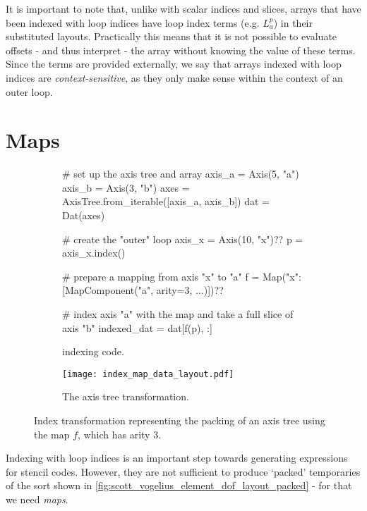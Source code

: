 \documentclass[thesis]{subfiles}
\begin{document}
It is important to note that, unlike with scalar indices and slices, arrays that have been indexed with loop indices have loop index terms (e.g. $L^p_a$) in their substituted layouts.
Practically this means that it is not possible to evaluate offsets - and thus interpret - the array without knowing the value of these terms.
Since the terms are provided externally, we say that arrays indexed with loop indices are \emph{context-sensitive}, as they only make sense within the context of an outer loop.

\section{Maps}

\begin{figure}
  \centering

  \begin{subfigure}{.9\textwidth}
    \begin{pyalg2}
      # set up the axis tree and array
      axis_a = Axis(5, "a")
      axis_b = Axis(3, "b")
      axes = AxisTree.from_iterable([axis_a, axis_b])
      dat = Dat(axes)

      # create the "outer" loop
      axis_x = Axis(10, "x")?\label{code:make_axis_x}?
      p = axis_x.index()

      # prepare a mapping from axis "x" to "a"
      f = Map({"x": [MapComponent("a", arity=3, ...)]})?\label{code:make_map}?

      # index axis "a" with the map and take a full slice of axis "b"
      indexed_dat = dat[f(p), :]
    \end{pyalg2}

    \caption{ indexing code.}
    \label{fig:index_map_code}
  \end{subfigure}

  \vspace{1em}

  \begin{subfigure}{\textwidth}
    \centering
    \texttt{[image: index\_map\_data\_layout.pdf]}
    \caption{The axis tree transformation.}
    \label{fig:index_map_data_layout}
  \end{subfigure}

  \caption{Index transformation representing the packing of an axis tree using the map $f$, which has arity 3.}
  \label{fig:index_map}
\end{figure}

Indexing with loop indices is an important step towards generating expressions for stencil codes.
However, they are not sufficient to produce `packed' temporaries of the sort shown in \cref{fig:scott_vogelius_element_dof_layout_packed} - for that we need \emph{maps}.
\end{document}

